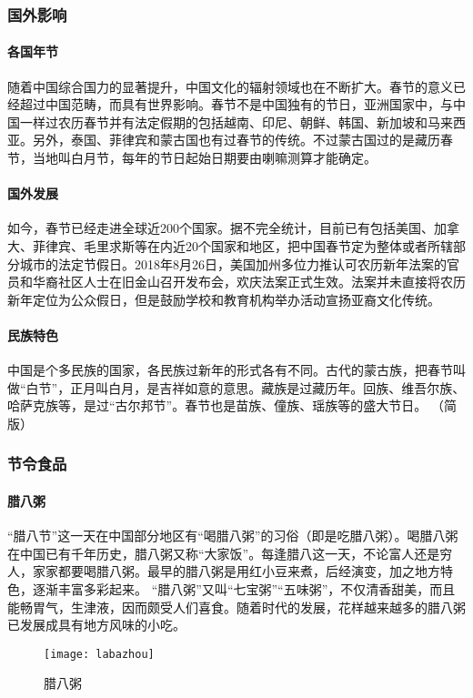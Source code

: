 \subsubsection{国外影响}

\paragraph{各国年节}
随着中国综合国力的显著提升，中国文化的辐射领域也在不断扩大。春节的意义已经超过中国范畴，而具有世界影响。春节不是中国独有的节日，亚洲国家中，与中国一样过农历春节并有法定假期的包括越南、印尼、朝鲜、韩国、新加坡和马来西亚。另外，泰国、菲律宾和蒙古国也有过春节的传统。不过蒙古国过的是藏历春节，当地叫白月节，每年的节日起始日期要由喇嘛测算才能确定。

\paragraph{国外发展}
如今，春节已经走进全球近200个国家。据不完全统计，目前已有包括美国、加拿大、菲律宾、毛里求斯等在内近20个国家和地区，把中国春节定为整体或者所辖部分城市的法定节假日。2018年8月26日，美国加州多位力推认可农历新年法案的官员和华裔社区人士在旧金山召开发布会，欢庆法案正式生效。法案并未直接将农历新年定位为公众假日，但是鼓励学校和教育机构举办活动宣扬亚裔文化传统。

\paragraph{民族特色}
中国是个多民族的国家，各民族过新年的形式各有不同。古代的蒙古族，把春节叫做“白节”，正月叫白月，是吉祥如意的意思。藏族是过藏历年。回族、维吾尔族、哈萨克族等，是过“古尔邦节”。春节也是苗族、僮族、瑶族等的盛大节日。                                                        （简版）



\subsubsection{节令食品}

\paragraph{腊八粥}
“腊八节”这一天在中国部分地区有“喝腊八粥”的习俗（即是吃腊八粥）。喝腊八粥在中国已有千年历史，腊八粥又称“大家饭”。每逢腊八这一天，不论富人还是穷人，家家都要喝腊八粥。最早的腊八粥是用红小豆来煮，后经演变，加之地方特色，逐渐丰富多彩起来。
“腊八粥”又叫“七宝粥”“五味粥”，不仅清香甜美，而且能畅胃气，生津液，因而颇受人们喜食。随着时代的发展，花样越来越多的腊八粥已发展成具有地方风味的小吃。
\begin{figure}[htb]
    \centering
    \texttt{[image: labazhou]}
    \caption{腊八粥}
\end{figure}
